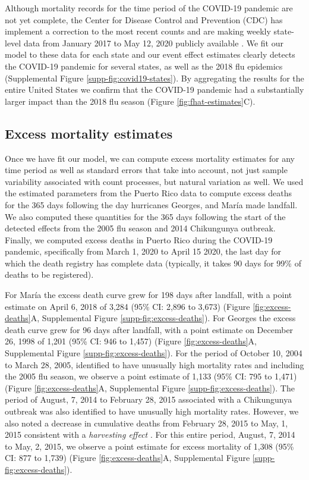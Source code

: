 \documentclass[11pt]{article}
\begin{document}
Although mortality records for the time period of the COVID-19 pandemic are not yet complete, the Center for Disease Control and Prevention (CDC) has implement a correction to the most recent counts and are making weekly state-level data from January 2017 to May 12, 2020 publicly available \cite{cdc2020covid19}. We fit our model to these data for each state and our event effect estimates clearly detects the COVID-19 pandemic for several states, as well as the 2018 flu epidemics (Supplemental Figure \ref{supp-fig:covid19-states}). By aggregating the results for the entire United States we confirm that the COVID-19 pandemic had a substantially larger impact than the 2018 flu season
(Figure \ref{fig:fhat-estimates}C).
 
\subsection{Excess mortality estimates}
\label{subsec:excess-mortality}
Once we have fit our model, we can compute excess mortality estimates for any time period as well as standard errors that take into account, not just sample variability associated with count processes, but natural variation as well. We used the estimated parameters from the Puerto Rico data to compute excess deaths for the 365 days following the day hurricanes Georges, and Mar\'ia made landfall. We also computed these quantities for the 365 days following the start of the detected effects from the 2005 flu season and 2014 Chikungunya outbreak. Finally, we computed excess deaths in Puerto Rico during the COVID-19 pandemic, specifically from March 1, 2020 to April 15 2020, the last day for which the death registry has complete data (typically, it takes 90 days for 99\% of deaths to be registered). 

For Mar\'ia the excess death curve grew for 198 days after landfall, with a point estimate on April 6, 2018 of 3,284 (95\% CI: 2,896 to 3,673) (Figure \ref{fig:excess-deaths}A, Supplemental Figure \ref{supp-fig:excess-deaths}). For Georges the excess death curve grew for 96 days after landfall, with a point estimate on December 26, 1998 of 1,201 (95\% CI: 946 to 1,457)  (Figure \ref{fig:excess-deaths}A, Supplemental Figure \ref{supp-fig:excess-deaths}). For the period of October 10, 2004 to March 28, 2005, identified to have unusually high mortality rates and including the 2005 flu season, we observe a point estimate of 1,133 (95\% CI: 795 to 1,471) (Figure \ref{fig:excess-deaths}A, Supplemental Figure \ref{supp-fig:excess-deaths}). The period of August, 7, 2014 to February 28, 2015 associated with a Chikungunya outbreak was also identified to have unusually high mortality rates. However, we also noted a decrease in cumulative deaths from February 28, 2015 to May, 1, 2015 consistent with a \emph{harvesting effect} \cite{hajat2005mortality, dushoff2006mortality}. For this entire period, August, 7, 2014 to May, 2, 2015, we observe a point estimate for excess mortality of 1,308 (95\% CI: 877 to 1,739) (Figure \ref{fig:excess-deaths}A, Supplemental Figure \ref{supp-fig:excess-deaths}).
\end{document}
